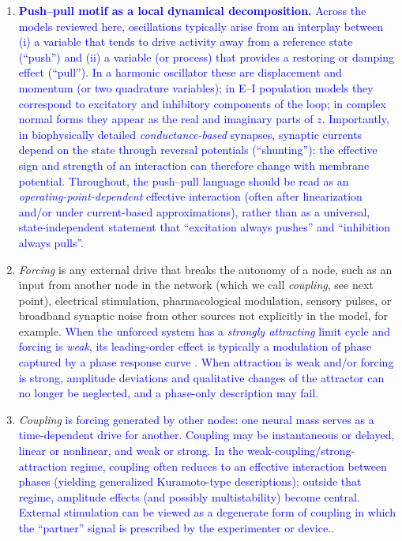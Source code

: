 \documentclass[12pt]{article}
\numberwithin{equation}{section}
\newcommand{\rev}[1]{\textcolor{blue}{#1}}
\begin{document}
\begin{enumerate}
\begin{enumerate}
\item 
\rev{\textbf{Push--pull motif as a local dynamical decomposition.}
Across the models reviewed here, oscillations typically arise from an interplay between
(i) a variable that tends to drive activity away from a reference state (``push'') and
(ii) a variable (or process) that provides a restoring or damping effect (``pull'').
In a harmonic oscillator these are displacement and momentum (or two quadrature variables);
in E--I population models they correspond to excitatory and inhibitory components of the loop;
in complex normal forms they appear as the real and imaginary parts of $z$.
Importantly, in biophysically detailed \emph{conductance-based} synapses, synaptic currents
depend on the state through reversal potentials (``shunting''): the effective sign and strength
of an interaction can therefore change with membrane potential.
Throughout, the push--pull language should be read as an \emph{operating-point-dependent}
effective interaction (often after linearization and/or under current-based approximations),
rather than as a universal, state-independent statement that ``excitation always pushes'' and
``inhibition always pulls''.}


\item \emph{Forcing} is any external drive that breaks the autonomy of a node, such as an input from another node in the network (which we call \textit{coupling}, see next point),  electrical stimulation, pharmacological modulation, sensory pulses, or broadband synaptic noise from other sources not explicitly in the model, for example.  
\rev{When the unforced system has a \emph{strongly attracting} limit cycle and forcing is \emph{weak},
its leading-order effect is typically a modulation of phase captured by a phase response curve \cite{Ermentrout1991}.
When attraction is weak and/or forcing is strong, amplitude deviations and qualitative changes
of the attractor can no longer be neglected, and a phase-only description may fail.\cite{Izhikevich2007}}

\item \emph{Coupling} \rev{is forcing generated by other nodes: one neural mass serves as a
time-dependent drive for another.
Coupling may be instantaneous or delayed, linear or nonlinear, and weak or strong.
In the weak-coupling/strong-attraction regime, coupling often reduces to an effective
interaction between phases (yielding generalized Kuramoto-type descriptions); outside that
regime, amplitude effects (and possibly multistability) become central.
External stimulation can be viewed as a degenerate form of coupling in which the ``partner''
signal is prescribed by the experimenter or device.}\cite{Pikovsky2003,Abrams2004}.  


\end{enumerate}
\end{enumerate}
\end{document}
